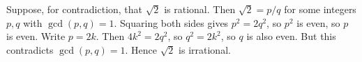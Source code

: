 Suppose, for contradiction, that $\sqrt{2}$ is rational. Then
$\sqrt{2} = p/q$ for some integers $p, q$ with $\gcd(p, q) = 1$.
Squaring both sides gives $p^2 = 2q^2$, so $p^2$ is even, so $p$ is even.
Write $p = 2k$. Then $4k^2 = 2q^2$, so $q^2 = 2k^2$, so $q$ is also even.
But this contradicts $\gcd(p, q) = 1$. Hence $\sqrt{2}$ is irrational.
